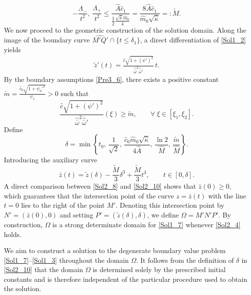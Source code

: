 \documentclass[3p,11pt]{elsarticle}
\numberwithin{equation}{section}
\begin{document}
\begin{equation*}\label{Sol2_7}
-\frac{\Lambda_{-}}{t^2}, \ \frac{\Lambda_{+}}{t^2} \leq 
\frac{\hat A \hat{c}_1}{\tfrac{1}{2}\frac{\sqrt{\hat \kappa}\hat{m}_0}{4}} 
= \frac{8\hat A\hat{c}_1}{\hat{m}_0\sqrt{\hat\kappa}} =: \widetilde{M}.
\end{equation*}
We now proceed to the geometric construction of the solution domain. 
Along the image of the boundary curve $\widehat{M'Q'}\cap\{t\le \delta_1\}$, 
a direct differentiation of \eqref{Sol1_2} yields
\begin{equation}\label{Sol2_8}
\begin{aligned}
\tilde{z}'(t) = \frac{\hat{c} \sqrt{1+(\psi')^2}}{\hat{\bar\omega}^2 \hat{\bar\omega}'}\, t.
\end{aligned}
\end{equation}
By the boundary assumptions \eqref{Pre3_6}, there exists a positive constant $\tilde m=\frac{\hat{c}_0 \sqrt{1+\psi_0'^2}}{\psi_1}>0$ such that
\begin{equation*}\label{Sol2_9}
\frac{\hat{c}\sqrt{1+(\psi')^2}}{\hat{\bar\omega}^2 \hat{\bar\omega}'}(\xi) \geq \tilde{m}, 
\qquad \forall \; \xi \in [\xi_1,\xi_2].
\end{equation*}
Define
\begin{equation}\label{Sol2_10}
     \delta = \min\left\{t_0,\, \frac{1}{\sqrt{2}},\, \frac{\hat{c}_0 \hat{m}_0\sqrt{\hat\kappa}}{4\hat A},\, 
      \frac{\ln 2}{\hat{M}},\, \frac{\tilde{m}}{\hat{M}}\right\}.
\end{equation}
Introducing the auxiliary curve
\begin{equation*}\label{Sol2_11}
    \bar z(t)=\tilde z(\delta)-\frac{\widetilde M}{3}\delta^3+\frac{\widetilde M}{3}t^3, \qquad t\in[0,\delta].
\end{equation*}
A direct comparison between \eqref{Sol2_8} and \eqref{Sol2_10} shows that $\bar z(0)\ge0$, which guarantees that the intersection point of the curve $z = \bar{z}(t)$ with the line $t=0$ lies to the right of the point $M'$. Denoting this intersection point by $N'=(\bar z(0),0)$ and setting $P'=(\tilde z(\delta),\delta)$, we define $\Omega=M'N'P'$. By construction, $\Omega$ is a strong determinate domain for \eqref{Sol1_7} whenever \eqref{Sol2_4} holds.

We aim to construct a solution to the degenerate boundary value problem \eqref{Sol1_7}–\eqref{Sol1_3} throughout the domain $\Omega$. It follows from the definition of $\delta$ in \eqref{Sol2_10} that the domain $\Omega$ is determined solely by the prescribed initial constants and is therefore independent of the particular procedure used to obtain the solution.
\end{document}
